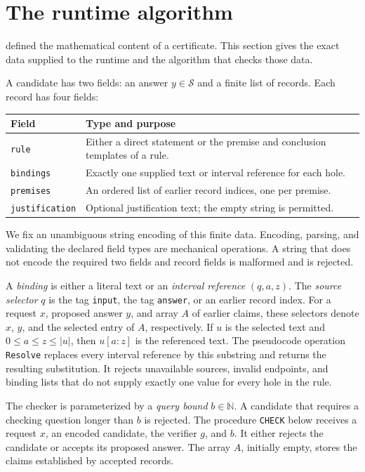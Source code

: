 \documentclass[11pt,twoside]{article}
\theoremstyle{definition}
\newcommand{\Stext}{\mathcal S}
\begin{document}
\section{The runtime algorithm}
\label{sec:runtime}

 defined the mathematical content of a
certificate. This section gives the exact data supplied to the runtime and the
algorithm that checks those data.

A candidate has two fields: an answer $y\in\Stext$ and a finite list of
records. Each record has four fields:
\begin{center}
\begin{tabular}{p{.16\linewidth}p{.75\linewidth}}
\toprule
Field & Type and purpose\\
\midrule
\texttt{rule} & Either a direct statement or the premise and conclusion templates of a rule.\\
\texttt{bindings} & Exactly one supplied text or interval reference for each hole.\\
\texttt{premises} & An ordered list of earlier record indices, one per premise.\\
\texttt{justification} & Optional justification text; the empty string is permitted.\\
\bottomrule
\end{tabular}
\end{center}
We fix an unambiguous string encoding of this finite data. Encoding, parsing,
and validating the declared field types are mechanical operations. A string
that does not encode the required two fields and record fields is malformed
and is rejected.

A \emph{binding} is either a literal text or an \emph{interval reference}
$(q,a,z)$. The \emph{source selector} $q$ is the tag
\texttt{input}, the tag \texttt{answer}, or an earlier record index. For a
request $x$, proposed answer $y$, and array $A$ of earlier claims, these
selectors denote $x$, $y$, and the selected entry of $A$, respectively. If
$u$ is the selected text and $0\le a\le z\le |u|$, then
$u[a:z]$ is the referenced text. The pseudocode operation \texttt{Resolve}
replaces every interval reference by this substring and returns the resulting
substitution. It rejects unavailable sources, invalid endpoints, and binding
lists that do not supply exactly one value for every hole in the rule.

The checker is parameterized by a \emph{query bound} $b\in\mathbb N$. A
candidate that requires a checking question longer than $b$ is rejected. The
procedure \texttt{CHECK} below receives a request $x$, an encoded
candidate, the verifier $g$, and $b$. It either rejects the
candidate or accepts its proposed answer. The
array $A$, initially empty, stores the claims established by accepted records.
\end{document}
